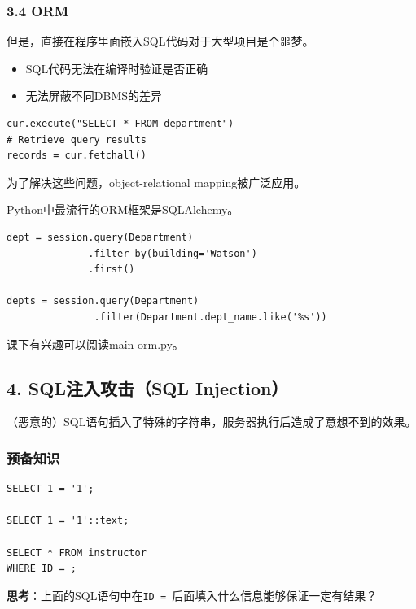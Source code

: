 \documentclass[aspectratio=169, 14pt]{beamer}
\begin{document}
\begin{frame}[fragile]
	\frametitle{3.4 ORM}
	但是，直接在程序里面嵌入SQL代码对于大型项目是个噩梦。

	\begin{itemize}
		\item SQL代码无法在编译时验证是否正确
		\item 无法屏蔽不同DBMS的差异
	\end{itemize}


	\begin{verbatim}
cur.execute("SELECT * FROM department")
# Retrieve query results
records = cur.fetchall()
\end{verbatim}

	为了解决这些问题，object-relational mapping被广泛应用。
\end{frame}

\begin{frame}[fragile]
	Python中最流行的ORM框架是\href{https://www.sqlalchemy.org/}{SQLAlchemy}。


	\begin{verbatim}
dept = session.query(Department)
              .filter_by(building='Watson')
              .first()

depts = session.query(Department)
               .filter(Department.dept_name.like('%s'))
\end{verbatim}

	课下有兴趣可以阅读\href{https://github.com/ChenZhongPu/db-swufe/blob/master/10_advanced/python-orm/main-orm.py}{main-orm.py}。
\end{frame}

\begin{frame}[fragile]
	\section{\textcolor{darkmidnightblue}{4. SQL注入攻击（SQL Injection）}}
	（恶意的）SQL语句插入了特殊的字符串，服务器执行后造成了意想不到的效果。
\end{frame}

\begin{frame}[fragile]
	\frametitle{预备知识}

	\begin{verbatim}
SELECT 1 = '1';

SELECT 1 = '1'::text;

SELECT * FROM instructor
WHERE ID = ;
    \end{verbatim}
	 \textbf{思考}：上面的SQL语句中在\texttt{ID = }后面填入什么信息能够保证一定有结果？
\end{frame}
\end{document}

